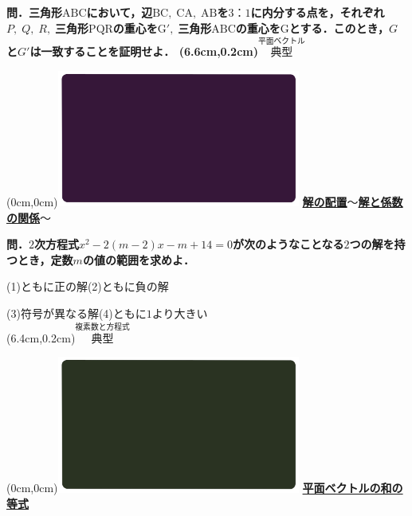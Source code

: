 \documentclass[10pt,
fleqn,
dvipdfmx,
uplatex
]{jsarticle}
\begin{document}
\large 
\bf\boldmath 問．三角形$\text{ABC}$において，辺$\text{BC},\;\text{CA},\;\text{AB}$を$3：1$に内分する点を，それぞれ$P,\;Q,\;R,\;$三角形$\text{PQR}$の重心を$\text{G}',\;$三角形$\text{ABC}$の重心を$\text{G}$とする．このとき，$G$と$G'$は一致することを証明せよ．
\at(6.6cm,0.2cm){\small\color{bradorange}$\overset{\text{平面ベクトル}}{\text{典型}}$}


\newpage

\at(0cm,0cm){\includegraphics[width=8cm,bb=0 0 1920 1080]{./youtube/thumbnails/templates/smart_background/複素数と方程式.jpeg}}
{\color{orange}\bf\boldmath\Large\underline{解の配置$〜$解と係数の関係$〜$}}\vspace{0.3zw}

\normalsize 
\bf\boldmath 問．$2$次方程式$x^2-2\left(m-2\right)x-m+{14}=0$が次のようなことなる$2$つの解を持つとき，定数$m$の値の範囲を求めよ．

\Large
(1)ともに正の解\hspace{0.2zw}(2)ともに負の解\vspace{0.2zw}

\normalsize
\hspace{0.2zw}(3)符号が異なる解\hspace{1.5zw}(4)ともに$1$より大きい\\

\at(6.4cm,0.2cm){\small\color{bradorange}$\overset{\text{複素数と方程式}}{\text{典型}}$}

\newpage



\at(0cm,0cm){\includegraphics[width=8cm,bb=0 0 1920 1080]{./youtube/thumbnails/templates/smart_background/平面ベクトル.jpeg}}
{\color{orange}\bf\boldmath\LARGE\underline{平面ベクトルの和の等式}}\vspace{0.3zw}
\end{document}
